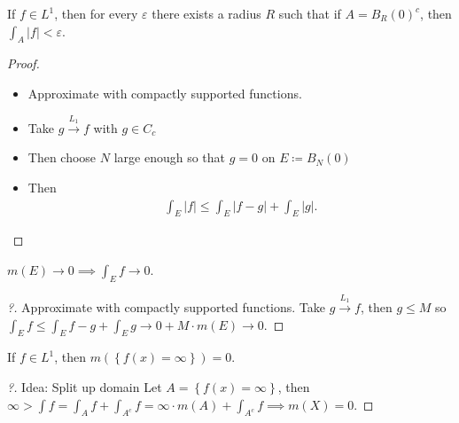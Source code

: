 \begin{theorem}

If \(f\in L^1\), then for every \(\varepsilon\) there exists a radius
\(R\) such that if \(A = B_R(0)^c\), then
\(\int_A {\left\lvert {f} \right\rvert} < \varepsilon\).

\end{theorem}

\begin{proof}

\envlist

\begin{itemize}
\tightlist
\item
  Approximate with compactly supported functions.
\item
  Take \(g\overset{L_1}\to f\) with \(g\in C_c\)
\item
  Then choose \(N\) large enough so that \(g=0\) on
  \(E\coloneqq B_N(0)\)
\item
  Then
  \begin{align*} \int_E {\left\lvert {f} \right\rvert} \leq \int_E{\left\lvert {f-g} \right\rvert} + \int_E {\left\lvert {g} \right\rvert}.\end{align*}
\end{itemize}

\end{proof}

\begin{proposition}

\(m(E) \to 0 \implies \int_E f \to 0\).

\end{proposition}

\begin{proof}[?]

Approximate with compactly supported functions. Take
\(g\overset{L_1}\to f\), then \(g \leq M\) so
\(\int_E{f} \leq \int_E{f-g} + \int_E g \to 0 + M \cdot m(E) \to 0\).

\end{proof}

\begin{proposition}

If \(f\in L^1\), then \(m(\left\{{f(x) = \infty}\right\}) = 0\).

\end{proposition}

\begin{proof}[?]

Idea: Split up domain Let \(A = \left\{{f(x) = \infty}\right\}\), then
\(\infty > \int f = \int_A f + \int_{A^c} f = \infty \cdot m(A) + \int_{A^c} f \implies m(X) =0\).

\end{proof}

